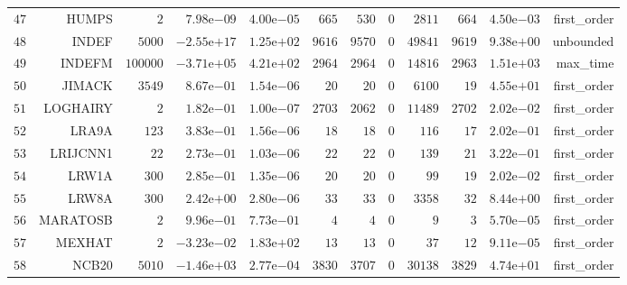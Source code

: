 \begin{longtable}{rrrrrrrrrrrr}
  \(    47\) & HUMPS & \(     2\) & \( 7.98\)e\(-09\) & \( 4.00\)e\(-05\) & \(   665\) & \(   530\) & \(     0\) & \(  2811\) & \(   664\) & \( 4.50\)e\(-03\) & first\_order \\
  \(    48\) & INDEF & \(  5000\) & \(-2.55\)e\(+17\) & \( 1.25\)e\(+02\) & \(  9616\) & \(  9570\) & \(     0\) & \( 49841\) & \(  9619\) & \( 9.38\)e\(+00\) & unbounded \\
  \(    49\) & INDEFM & \(100000\) & \(-3.71\)e\(+05\) & \( 4.21\)e\(+02\) & \(  2964\) & \(  2964\) & \(     0\) & \( 14816\) & \(  2963\) & \( 1.51\)e\(+03\) & max\_time \\
  \(    50\) & JIMACK & \(  3549\) & \( 8.67\)e\(-01\) & \( 1.54\)e\(-06\) & \(    20\) & \(    20\) & \(     0\) & \(  6100\) & \(    19\) & \( 4.55\)e\(+01\) & first\_order \\
  \(    51\) & LOGHAIRY & \(     2\) & \( 1.82\)e\(-01\) & \( 1.00\)e\(-07\) & \(  2703\) & \(  2062\) & \(     0\) & \( 11489\) & \(  2702\) & \( 2.02\)e\(-02\) & first\_order \\
  \(    52\) & LRA9A & \(   123\) & \( 3.83\)e\(-01\) & \( 1.56\)e\(-06\) & \(    18\) & \(    18\) & \(     0\) & \(   116\) & \(    17\) & \( 2.02\)e\(-01\) & first\_order \\
  \(    53\) & LRIJCNN1 & \(    22\) & \( 2.73\)e\(-01\) & \( 1.03\)e\(-06\) & \(    22\) & \(    22\) & \(     0\) & \(   139\) & \(    21\) & \( 3.22\)e\(-01\) & first\_order \\
  \(    54\) & LRW1A & \(   300\) & \( 2.85\)e\(-01\) & \( 1.35\)e\(-06\) & \(    20\) & \(    20\) & \(     0\) & \(    99\) & \(    19\) & \( 2.02\)e\(-02\) & first\_order \\
  \(    55\) & LRW8A & \(   300\) & \( 2.42\)e\(+00\) & \( 2.80\)e\(-06\) & \(    33\) & \(    33\) & \(     0\) & \(  3358\) & \(    32\) & \( 8.44\)e\(+00\) & first\_order \\
  \(    56\) & MARATOSB & \(     2\) & \( 9.96\)e\(-01\) & \( 7.73\)e\(-01\) & \(     4\) & \(     4\) & \(     0\) & \(     9\) & \(     3\) & \( 5.70\)e\(-05\) & first\_order \\
  \(    57\) & MEXHAT & \(     2\) & \(-3.23\)e\(-02\) & \( 1.83\)e\(+02\) & \(    13\) & \(    13\) & \(     0\) & \(    37\) & \(    12\) & \( 9.11\)e\(-05\) & first\_order \\
  \(    58\) & NCB20 & \(  5010\) & \(-1.46\)e\(+03\) & \( 2.77\)e\(-04\) & \(  3830\) & \(  3707\) & \(     0\) & \( 30138\) & \(  3829\) & \( 4.74\)e\(+01\) & first\_order \\

\end{longtable}
